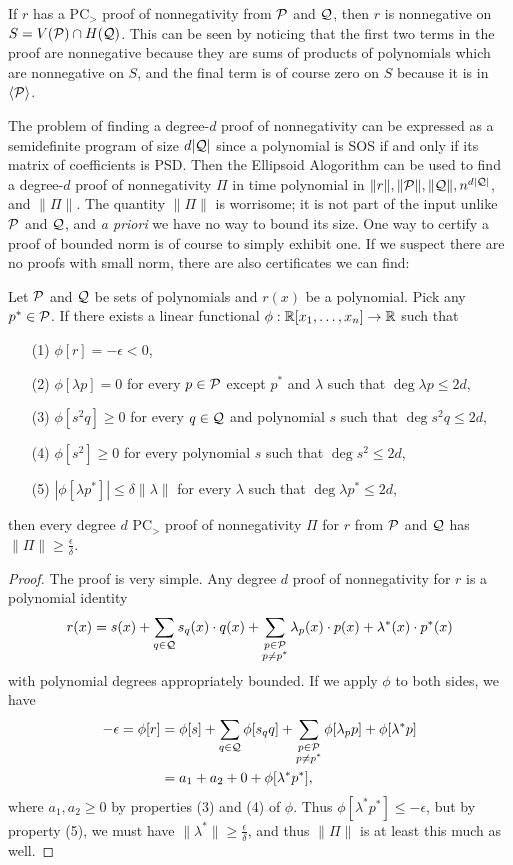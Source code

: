 If $r$ has a PC$_>$ proof of nonnegativity from $\mathcal P$ and $\mathcal Q$, then $r$ is nonnegative on $S = V(\mathcal P) \cap H(\mathcal Q)$. This can be seen by noticing that the first two terms in the proof are nonnegative because they are sums of products of polynomials which are nonnegative on $S$, and the final term is of course zero on $S$ because it is in $\langle \mathcal P \rangle$. 

The problem of finding a degree-$d$ proof of nonnegativity can be expressed as a semidefinite program of size $d|\mathcal Q|$ since a polynomial is SOS if and only if its matrix of coefficients is PSD. Then the Ellipsoid Alogorithm can be used to find a degree-$d$ proof of nonnegativity $\Pi$ in time polynomial in $\|r\|, \|\mathcal P\|, \|\mathcal Q\|, n^{d|\mathcal Q|}$, and $\|\Pi\|$. The quantity $\|\Pi\|$ is worrisome; it is not part of the input unlike $\mathcal P$ and $\mathcal Q$, and \emph{a priori} we have no way to bound its size. One way to certify a proof of bounded norm is of course to simply exhibit one. If we suspect there are no proofs with small norm, there are also certificates we can find:
\begin{lemma}\label{lem:prelim_dual_cert}
Let $\mathcal P$ and $\mathcal Q$ be sets of polynomials and $r(x)$ be a polynomial. Pick any $p^* \in \mathcal P$. If there exists a linear functional $\phi: \mathbb R[x_1,\dots,x_n] \rightarrow \mathbb R$ such that 
\begin{enumerate}
\item[(1)] $\phi[r] = -\epsilon < 0$,
\item[(2)] $\phi[\lambda p] = 0$ for every $p \in \mathcal P$ except $p^*$ and $\lambda$ such that $\deg \lambda p \leq 2d$,
\item[(3)] $\phi[s^2q] \geq 0$ for every $q \in \mathcal Q$ and polynomial $s$ such that $\deg s^2q \leq 2d$,
\item[(4)] $\phi[s^2] \geq 0$ for every polynomial $s$ such that $\deg s^2 \leq 2d$,
\item[(5)] $|\phi[\lambda p^*]| \leq \delta \|\lambda\|$ for every $\lambda$ such that $\deg \lambda p^* \leq 2d$,
\end{enumerate}
then every degree $d$ PC$_>$ proof of nonnegativity $\Pi$ for $r$ from $\mathcal P$ and $\mathcal Q$ has $\|\Pi\| \geq \frac{\epsilon}{\delta}$.
\end{lemma}
\begin{proof}
The proof is very simple. Any degree $d$ proof of nonnegativity for $r$ is a polynomial identity
\[r(x) = s(x) + \sum_{q \in \mathcal Q} s_q(x)\cdot q(x) + \sum_{\substack{p \in \mathcal P \\ p \neq p^*}} \lambda_p(x) \cdot p(x) + \lambda^*(x) \cdot p^*(x)\]
with polynomial degrees appropriately bounded. If we apply $\phi$ to both sides, we have 
\begin{align*}
-\epsilon = \phi[r] &= \phi[s] + \sum_{q \in \mathcal Q} \phi[s_qq] + \sum_{\substack{p \in \mathcal P \\ p \neq p^*}} \phi[\lambda_p p] + \phi[\lambda^*p] \\
&= a_1 + a_2 + 0 + \phi[\lambda^* p^*],
\end{align*}
where $a_1,a_2 \geq 0$ by properties (3) and (4) of $\phi$. Thus $\phi[\lambda^* p^*] \leq -\epsilon$, but by property (5), we must have $\|\lambda^*\| \geq \frac{\epsilon}{\delta}$, and thus $\|\Pi\|$ is at least this much as well.
\end{proof}
